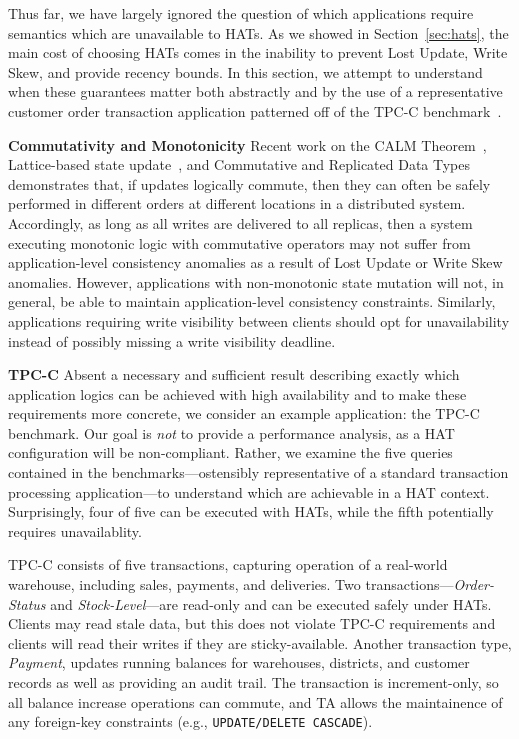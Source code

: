 Thus far, we have largely ignored the question of which applications
require semantics which are unavailable to HATs. As we showed in
Section~\ref{sec:hats}, the main cost of choosing HATs comes in the
inability to prevent Lost Update, Write Skew, and provide recency
bounds. In this section, we attempt to understand when these
guarantees matter both abstractly and by the use of a representative
customer order transaction application patterned off of the TPC-C
benchmark~\cite{tpcc}.

\vspace{.5em}\noindent\textbf{Commutativity and Monotonicity} Recent
work on the CALM Theorem~\cite{calm}, Lattice-based state
update~\cite{blooml}, and Commutative and Replicated Data
Types~\cite{crdt} demonstrates that, if updates logically commute,
then they can often be safely performed in different orders at
different locations in a distributed system. Accordingly, as long as
all writes are delivered to all replicas, then a system executing
monotonic logic with commutative operators may not suffer from
application-level consistency anomalies as a result of Lost Update or
Write Skew anomalies. However, applications with non-monotonic state
mutation will not, in general, be able to maintain application-level
consistency constraints. Similarly, applications requiring write
visibility between clients should opt for unavailability instead of
possibly missing a write visibility deadline.

\vspace{.5em}\noindent\textbf{TPC-C} Absent a necessary and sufficient
result describing exactly which application logics can be achieved
with high availability and to make these requirements more concrete,
we consider an example application: the TPC-C benchmark. Our goal is
\textit{not} to provide a performance analysis, as a HAT
configuration will be non-compliant. Rather, we examine the five
queries contained in the benchmarks---ostensibly representative of a
standard transaction processing application---to understand which are
achievable in a HAT context. Surprisingly, four of five can be
executed with HATs, while the fifth potentially requires unavailablity.

TPC-C consists of five transactions, capturing operation of a
real-world warehouse, including sales, payments, and deliveries. Two
transactions---\textit{Order-Status} and \textit{Stock-Level}---are
read-only and can be executed safely under HATs. Clients may read
stale data, but this does not violate TPC-C requirements and clients
will read their writes if they are sticky-available. Another
transaction type, \textit{Payment}, updates running balances for
warehouses, districts, and customer records as well as providing an
audit trail. The transaction is increment-only, so all balance
increase operations can commute, and TA allows the maintainence of any
foreign-key constraints (e.g., \texttt{UPDATE/DELETE CASCADE}).

